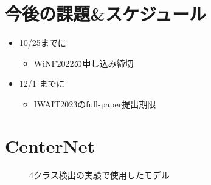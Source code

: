 \documentclass[a4j]{ujarticle}
\begin{document}
    \section{今後の課題\&スケジュール}
        \begin{itemize}
            \item 10/25までに
            \begin{itemize}
                \item WiNF2022の申し込み締切
            \end{itemize}
            \item 12/1 までに
            \begin{itemize}
                \item IWAIT2023のfull-paper提出期限
            \end{itemize}
        \end{itemize}

    \appendix
	\def\thesection{付録\Alph{section}}
    \section{CenterNet}
        \begin{figure}[!h]
            \centering
            \caption{4クラス検出の実験で使用したモデル}
        \end{figure}
\end{document}
